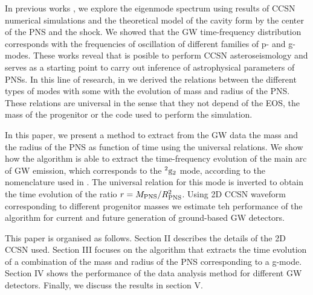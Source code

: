In previous works \cite{Torres:2018, Torres:2019a}, we explore the eigenmode spectrum using results of CCSN numerical simulations and the theoretical model of the cavity form by the center of the PNS and the shock. We showed that the GW time-frequency distribution corresponds with the frequencies of oscillation of different families of p- and g-modes. These works reveal that is posible to perform CCSN asteroseismology and serves as a starting point to carry out inference of astrophysical parameters of PNSs. In this line of research, in \cite{Torres:2019b} we derived the relations between the different types of modes with some with the evolution of mass and radius of the PNS. These relations are universal in the sense that they not depend of the EOS, the mass of the progenitor or the code used to perform the simulation. 

In this paper, we present a method to extract from the GW data the mass and the radius of the PNS as function of time using the universal relations. We show how the algorithm is able to extract the time-frequency evolution of the main arc of GW emission, which corresponds to the $^2\rm{g}_2$ mode, according to the nomenclature used in \cite{Torres:2019b}. The universal relation for this mode is inverted to obtain the time evolution of the ratio $r=M_{\rm PNS}/R_{\rm PNS}^2$. Using 2D CCSN waveform corresponding to different progenitor masses we estimate teh performance of the algorithm for current and future generation of ground-based GW detectors.

This paper is organised as follows. Section II describes the details of the 2D CCSN used. Section III focuses on the algorithm that extracts the time evolution of a combination of the mass and radius of the PNS corresponding to a g-mode. Section IV shows the performance of the data analysis method for different GW detectors. Finally, we discuss the results in section V.


